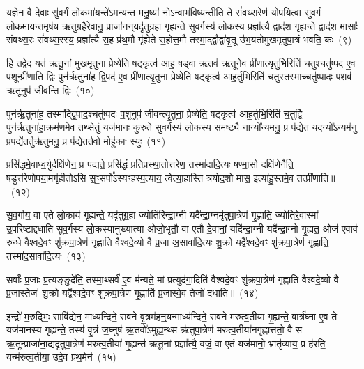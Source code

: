 {\anuvakamend[{ध्रु॒वस्तस्मा॑दे॒व य॒ज्ञस्यैका॒न्नच॑त्वारि॒ꣳ॒शच्च॑}]}%

य॒ज्ञेन॒ वै दे॒वाः सु॑व॒र्गं लो॒कमा॑य॒न्ते॑\-ऽमन्यन्त मनु॒ष्या॑ नो॒\-ऽन्वाभ॑विष्य॒न्तीति॒ ते सं॑वथ्स॒रेण॑ योपयि॒त्वा सु॑व॒र्गं लो॒कमा॑य॒न्तमृष॑य ऋतुग्र॒हैरे॒वानु॒ प्राजा॑न॒न्॒यदृ॑तुग्र॒हा गृ॒ह्यन्ते॑ सुव॒र्गस्य॑ लो॒कस्य॒ प्रज्ञा᳚त्यै॒ द्वाद॑श गृह्यन्ते॒ द्वाद॑श॒ मासाः᳚ संवथ्स॒रः सं॑वथ्स॒रस्य॒ प्रज्ञा᳚त्यै स॒ह प्र॑थ॒मौ गृ॑ह्येते स॒होत्त॒मौ तस्मा॒द्द्वौद्वा॑वृ॒तू उ॑भ॒यतो॑मुखमृतुपा॒त्रं भ॑वति॒ कः~(९)

हि तद्वेद॒ यत॑ ऋतू॒नां मुख॑मृ॒तुना॒ प्रेष्येति॒ षट्कृत्व॑ आह॒ षड्वा ऋ॒तव॑ ऋ॒तूने॒व प्री॑णात्यृ॒तुभि॒रिति॑ च॒तुश्चतु॑ष्पद ए॒व प॒शून्प्री॑णाति॒ द्विः पुन॑र्\mbox{}ऋ॒तुना॑ह द्वि॒पद॑ ए॒व प्री॑णात्यृ॒तुना॒ प्रेष्येति॒ षट्कृत्व॑ आह॒र्तुभि॒रिति॑ च॒तुस्तस्मा॒च्चतु॑ष्पादः प॒शव॑ ऋ॒तूनुप॑ जीवन्ति॒ द्विः~(१०)

पुन॑र्\mbox{}ऋ॒तुना॑ह॒ तस्मा᳚द्द्वि॒पाद॒श्चतु॑ष्पदः प॒शूनुप॑ जीवन्त्यृ॒तुना॒ प्रेष्येति॒ षट्कृत्व॑ आह॒र्तुभि॒रिति॑ च॒तुर्द्विः पुन॑र्\mbox{}ऋ॒तुना॑हा॒क्रम॑णमे॒व तथ्सेतुं॒ यज॑मानः कुरुते सुव॒र्गस्य॑ लो॒कस्य॒ सम॑ष्ट्यै॒ नान्यो᳚न्यमनु॒ प्र प॑द्येत॒ यद॒न्यो᳚\-ऽन्यम॑नु प्र॒पद्ये॑त॒र्तुर्\mbox{}ऋ॒तुमनु॒ प्र प॑द्येत॒र्तवो॒ मोहु॑काः स्युः~(११)

प्रसि॑द्धमे॒वाध्व॒र्युर्दक्षि॑णेन॒ प्र प॑द्यते॒ प्रसि॑द्धं प्रतिप्रस्था॒तोत्त॑रेण॒ तस्मा॑दादि॒त्यः षण्मा॒सो दक्षि॑णेनैति॒ षडुत्त॑रेणोपया॒मगृ॑हीतो\-ऽसि स॒ꣳ॒सर्पो᳚\-ऽस्यꣳहस्प॒त्याय॒ त्वेत्या॒हास्ति॑ त्रयोद॒शो मास॒ इत्या॑हु॒स्तमे॒व तत्प्री॑णाति॥~(१२)

{\anuvakamend[{को जी॑वन्ति॒ द्विः स्यु॒श्चतु॑स्त्रिꣳशच्च}]}%

सु॒व॒र्गाय॒ वा ए॒ते लो॒काय॑ गृह्यन्ते॒ यदृ॑तुग्र॒हा ज्योति॑रिन्द्रा॒ग्नी यदै᳚न्द्रा॒ग्नमृ॑तुपा॒त्रेण॑ गृ॒ह्णाति॒ ज्योति॑रे॒वास्मा॑ उ॒परि॑ष्टाद्दधाति सुव॒र्गस्य॑ लो॒कस्यानु॑ख्यात्या ओजो॒भृतौ॒ वा ए॒तौ दे॒वानां॒ यदि॑न्द्रा॒ग्नी यदै᳚न्द्रा॒ग्नो गृ॒ह्यत॒ ओज॑ ए॒वाव॑ रुन्धे वैश्वदे॒वꣳ शु॑क्रपा॒त्रेण॑ गृह्णाति वैश्वदे॒व्यो॑ वै प्र॒जा अ॒सावा॑दि॒त्यः शु॒क्रो यद्वै᳚श्वदे॒वꣳ शु॑क्रपा॒त्रेण॑ गृ॒ह्णाति॒ तस्मा॑द॒सावा॑दि॒त्यः~(१३)

सर्वाः᳚ प्र॒जाः प्र॒त्यङ्ङुदे॑ति॒ तस्मा॒थ्सर्व॑ ए॒व म॑न्यते॒ मां प्रत्युद॑गा॒दिति॑ वैश्वदे॒वꣳ शु॑क्रपा॒त्रेण॑ गृह्णाति वैश्वदे॒व्यो॑ वै प्र॒जास्तेजः॑ शु॒क्रो यद्वै᳚श्वदे॒वꣳ शु॑क्रपा॒त्रेण॑ गृ॒ह्णाति॑ प्र॒जास्वे॒व तेजो॑ दधाति॥~(१४)

{\anuvakamend[{तस्मा॑द॒सावा॑दि॒त्यस्त्रि॒ꣳ॒शच्च॑}]}%

इन्द्रो॑ म॒रुद्भिः॒ सांवि॑द्येन॒ माध्य॑न्दिने॒ सव॑ने वृ॒त्रम॑ह॒न्॒यन्माध्य॑न्दिने॒ सव॑ने मरुत्व॒तीया॑ गृ॒ह्यन्ते॒ वार्त्र॑घ्ना ए॒व ते यज॑मानस्य गृह्यन्ते॒ तस्य॑ वृ॒त्रं ज॒घ्नुष॑ ऋ॒तवो॑\-ऽमुह्य॒न्थ्स ऋ॑तुपा॒त्रेण॑ मरुत्व॒तीया॑नगृह्णा॒त्ततो॒ वै स ऋ॒तून्प्राजा॑ना॒द्यदृ॑तुपा॒त्रेण॑ मरुत्व॒तीया॑ गृ॒ह्यन्त॑ ऋतू॒नां प्रज्ञा᳚त्यै॒ वज्रं॒ वा ए॒तं यज॑मानो॒ भ्रातृ॑व्याय॒ प्र ह॑रति॒ यन्म॑रुत्व॒तीया॒ उदे॒व प्र॑थ॒मेन॑~(१५)

